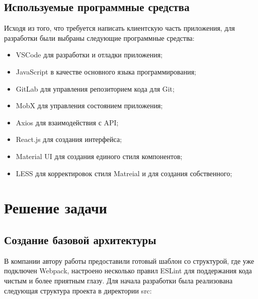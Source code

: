 \documentclass[12pt, a4paper]{diplom}
\begin{document}
\section{Используемые программные средства}

Исходя из того, что требуется написать клиентскую часть приложения, для разработки были выбраны следующие программные средства:

\begin{itemize}
\item VSCode\cite{VSCode} для разработки и отладки приложения;
\item JavaScript в качестве основного языка программирования;
\item GitLab для управления репозиторием кода для Git;
\item MobX для управления состоянием приложения;
\item Axios для взаимодействия с API;
\item React.js для создания интерфейса;
\item Material UI для создания единого стиля компонентов;
\item LESS для корректировок стиля Matreial и для создания собственного;
\end{itemize}

\chapter{Решение задачи}

\section{Создание базовой архитектуры}
В компании автору работы предоставили готовый шаблон со структурой, где уже подключен Webpack, настроено несколько правил ESLint для поддержания кода чистым и более приятным глазу.
Для начала разработки была реализована следующая структура проекта в директории src:

\medskip

\renewcommand*\DTstyle{\ttfamily\textcolor{black}}
\end{document}
